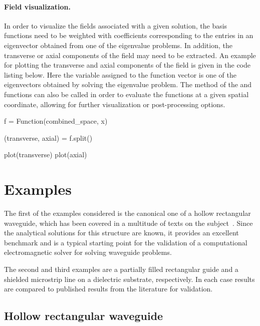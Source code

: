 \paragraph{Field visualization.}

In order to visualize the fields associated with a given solution, the
basis functions need to be weighted with coefficients corresponding to
the entries in an eigenvector obtained from one of the eigenvalue
problems. In addition, the transverse or axial components of the field
may need to be extracted. An example for plotting the transverse and
axial components of the field is given in the code listing below.
Here the variable  assigned to the function vector is one of
the eigenvectors obtained by solving the eigenvalue
problem. The  method of the  and 
functions can also be called in order to evaluate the functions at a
given spatial coordinate, allowing for further visualization or
post-processing options.
\begin{python}
f = Function(combined_space, x)

(transverse, axial) = f.split()

plot(transverse)
plot(axial)
\end{python}

\section{Examples}
\label{lezar:sec:Examples}

The first of the examples considered is the canonical one of a hollow
rectangular waveguide, which has been covered in a multitude of texts
on the subject~\citep{Davidson2011, Jin2002,
PelosiCoccioliSelleri1998, Pozar2005}. Since the analytical solutions
for this structure are known, it provides an excellent benchmark and
is a typical starting point for the validation of a computational
electromagnetic solver for solving waveguide problems.

The second and third examples are a partially filled rectangular guide
and a shielded microstrip line on a dielectric substrate,
respectively. In each case results are compared to published results
from the literature for validation.

\subsection{Hollow rectangular waveguide}

